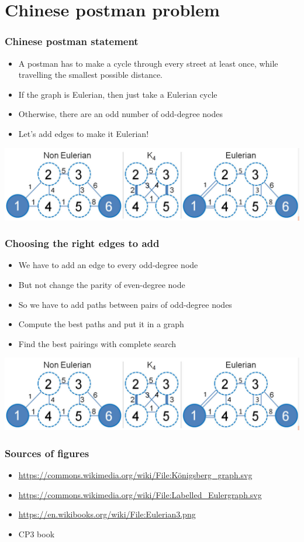 \documentclass[12pt]{beamer}
\begin{document}
\section{Chinese postman problem}

\begin{frame}
\frametitle{Chinese postman statement}
\begin{itemize}
\item A postman has to make a cycle through every street at least once, while travelling the smallest possible distance.
\item If the graph is Eulerian, then just take a Eulerian cycle
\item Otherwise, there are an odd number of odd-degree nodes
\item Let's add edges to make it Eulerian!
\end{itemize}
\begin{center}
\includegraphics[width=.9\linewidth]{img/cp3-complete}
\end{center}
\end{frame}

\begin{frame}
\frametitle{Choosing the right edges to add}
\begin{itemize}
\item We have to add an edge to every odd-degree node
\item But not change the parity of even-degree node
\item So we have to add paths between pairs of odd-degree nodes
\item Compute the best paths and put it in a graph
\item Find the best pairings with complete search
\end{itemize}
\begin{center}
\includegraphics[width=.9\linewidth]{img/cp3-complete}
\end{center}
\end{frame}

\begin{frame}
\frametitle{Sources of figures}
\begin{itemize}
\item \url{https://commons.wikimedia.org/wiki/File:Königsberg_graph.svg}
\item \url{https://commons.wikimedia.org/wiki/File:Labelled_Eulergraph.svg}
\item \url{https://en.wikibooks.org/wiki/File:Eulerian3.png}
\item CP3 book
\end{itemize}
\end{frame}
\end{document}
